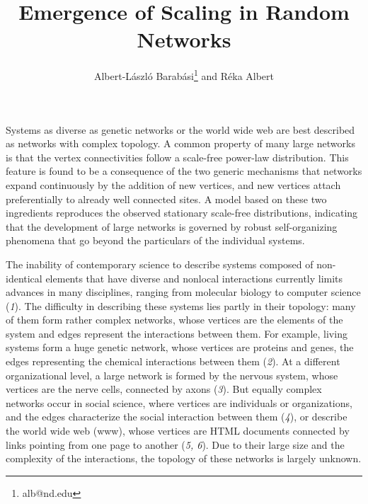 


\title{Emergence of Scaling in Random Networks}
\author{Albert-L\'aszl\'o Barab\'asi\thanks{alb@nd.edu} and R\'eka Albert}
\address{Department of Physics,
        University of Notre-Dame, Notre-Dame, IN 46556}
\maketitle
\vspace{2cm}

Systems as diverse as genetic networks or the world wide web are best described as networks with complex topology. A common property of many large networks is that the vertex connectivities follow a scale-free power-law distribution. This feature is found to be a consequence of the two generic mechanisms that networks expand continuously  by the addition of new vertices, and new vertices attach preferentially to already well connected sites. A model based on these two ingredients reproduces the observed stationary scale-free distributions, indicating that the development of large networks is governed by robust self-organizing phenomena that go beyond the particulars of the individual  systems.

\newpage

The inability of contemporary science to describe systems composed of non-identical elements that have diverse and nonlocal interactions currently limits advances in many disciplines, ranging from molecular biology  to computer science ({\it 1}). The difficulty in describing these systems lies partly in their topology: many of them form rather complex networks, whose vertices are the elements of the system and edges represent the interactions between them. For example, living systems form a huge genetic network, whose vertices are proteins and genes,  the edges representing the chemical interactions between them ({\it 2}). At a different organizational level, a large network is formed by the nervous system, whose vertices are the nerve cells, connected by axons ({\it 3}). But equally complex networks occur in social science, where vertices are individuals or organizations, and the edges characterize the social interaction between them ({\it 4}), or describe the world wide web (www), whose vertices are  HTML documents connected by links pointing  from one page to another ({\it 5, 6}). Due to their large size and the complexity of the interactions, the topology of these networks is largely unknown.


